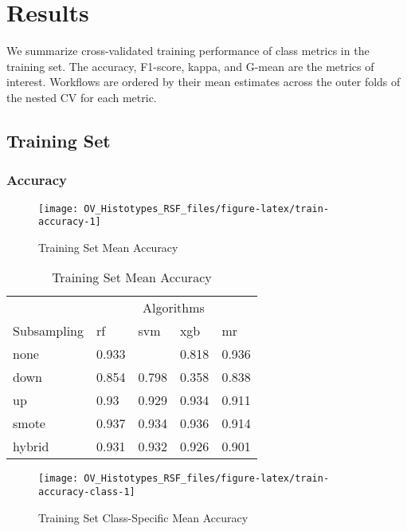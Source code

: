 \documentclass[
]{report}
\begin{document}
\chapter{Results}\label{results}

We summarize cross-validated training performance of class metrics in the training set. The accuracy, F1-score, kappa, and G-mean are the metrics of interest. Workflows are ordered by their mean estimates across the outer folds of the nested CV for each metric.

\section{Training Set}\label{training-set}

\subsection{Accuracy}\label{accuracy-1}

\begin{figure}[H]

{\centering \texttt{[image: OV\_Histotypes\_RSF\_files/figure-latex/train-accuracy-1]} 

}

\caption{Training Set Mean Accuracy}\label{fig:train-accuracy}
\end{figure}

\begin{table}

\caption{\label{tab:train-accuracy-table}Training Set Mean Accuracy}
\centering
\begin{tabular}[t]{l|l|l|l|l}
\hline
\multicolumn{1}{c|}{ } & \multicolumn{4}{c}{Algorithms} \\
\cline{2-5}
Subsampling & rf & svm & xgb & mr\\
\hline
none & 0.933 & \cellcolor[HTML]{90ee90}{0.938} & 0.818 & 0.936\\
\hline
down & 0.854 & 0.798 & 0.358 & 0.838\\
\hline
up & 0.93 & 0.929 & 0.934 & 0.911\\
\hline
smote & 0.937 & 0.934 & 0.936 & 0.914\\
\hline
hybrid & 0.931 & 0.932 & 0.926 & 0.901\\
\hline
\end{tabular}
\end{table}

\begin{figure}[H]

{\centering \texttt{[image: OV\_Histotypes\_RSF\_files/figure-latex/train-accuracy-class-1]} 

}

\caption{Training Set Class-Specific Mean Accuracy}\label{fig:train-accuracy-class}
\end{figure}
\end{document}
